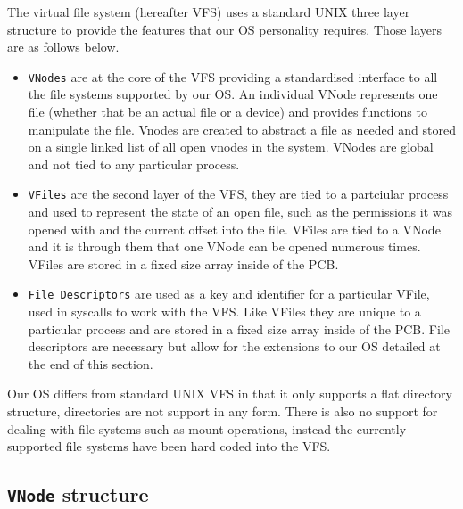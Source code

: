 \documentclass[12pt,english]{article}
\begin{document}
The virtual file system (hereafter VFS) uses a standard UNIX three layer structure to provide the features that our OS personality requires. Those layers are as follows below.

\begin{itemize}
\item \texttt{VNodes} are at the core of the VFS providing a standardised interface to all the file systems supported by our OS. An individual VNode represents one file (whether that be an actual file or a device) and provides functions to manipulate the file. Vnodes are created to abstract a file as needed and stored on a single linked list of all open vnodes in the system. VNodes are global and not tied to any particular process.
\item \texttt{VFiles} are the second layer of the VFS, they are tied to a partciular process and used to represent the state of an open file, such as the permissions it was opened with and the current offset into the file. VFiles are tied to a VNode and it is through them that one VNode can be opened numerous times. VFiles are stored in a fixed size array inside of the PCB.
\item \texttt{File Descriptors} are used as a key and identifier for a particular VFile, used in syscalls to work with the VFS. Like VFiles they are unique to a particular process and are stored in a fixed size array inside of the PCB. File descriptors are necessary but allow for the extensions to our OS detailed at the end of this section.
\end{itemize}

Our OS differs from standard UNIX VFS in that it only supports a flat directory structure, directories are not support in any form. There is also no support for dealing with file systems such as mount operations, instead the currently supported file systems have been hard coded into the VFS.

\subsection{\texttt{VNode} structure}
\end{document}
